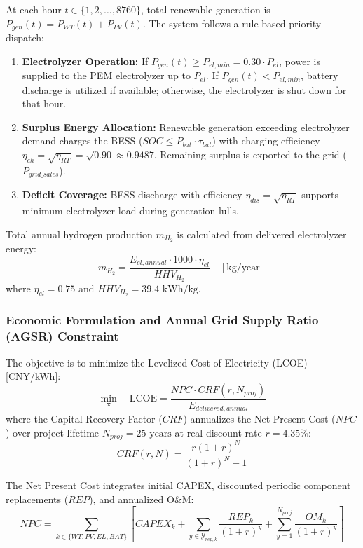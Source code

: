 At each hour $t \in \{1, 2, \dots, 8760\}$, total renewable generation is $P_{gen}(t) = P_{WT}(t) + P_{PV}(t)$. The system follows a rule-based priority dispatch:
\begin{enumerate}
    \item \textbf{Electrolyzer Operation:} If $P_{gen}(t) \ge P_{el,min} = 0.30 \cdot P_{el}$, power is supplied to the PEM electrolyzer up to $P_{el}$. If $P_{gen}(t) < P_{el,min}$, battery discharge is utilized if available; otherwise, the electrolyzer is shut down for that hour.
    \item \textbf{Surplus Energy Allocation:} Renewable generation exceeding electrolyzer demand charges the BESS ($SOC \le P_{bat} \cdot \tau_{bat}$) with charging efficiency $\eta_{ch} = \sqrt{\eta_{RT}} = \sqrt{0.90} \approx 0.9487$. Remaining surplus is exported to the grid ($P_{grid\_sales}$).
    \item \textbf{Deficit Coverage:} BESS discharge with efficiency $\eta_{dis} = \sqrt{\eta_{RT}}$ supports minimum electrolyzer load during generation lulls.
\end{enumerate}

Total annual hydrogen production $m_{H_2}$ is calculated from delivered electrolyzer energy:
\begin{equation}
m_{H_2} = \frac{E_{el,annual} \cdot 1000 \cdot \eta_{el}}{HHV_{H_2}} \quad [\text{kg/year}]
\label{eq:h2_production}
\end{equation}
where $\eta_{el} = 0.75$ and $HHV_{H_2} = 39.4\text{ kWh/kg}$.

\subsubsection{Economic Formulation and Annual Grid Supply Ratio (AGSR) Constraint}

The objective is to minimize the Levelized Cost of Electricity (LCOE) [CNY/kWh]:
\begin{equation}
\min_{\mathbf{x}} \quad \text{LCOE} = \frac{NPC \cdot CRF(r, N_{proj})}{E_{delivered,annual}}
\label{eq:lcoe_obj}
\end{equation}
where the Capital Recovery Factor ($CRF$) annualizes the Net Present Cost ($NPC$) over project lifetime $N_{proj} = 25\text{ years}$ at real discount rate $r = 4.35\%$:
\begin{equation}
CRF(r, N) = \frac{r(1+r)^N}{(1+r)^N - 1}
\label{eq:crf_factor}
\end{equation}

The Net Present Cost integrates initial CAPEX, discounted periodic component replacements ($REP$), and annualized O\&M:
\begin{equation}
NPC = \sum_{k \in \{WT, PV, EL, BAT\}} \left[ CAPEX_k + \sum_{y \in \mathcal{Y}_{rep,k}} \frac{REP_k}{(1+r)^y} + \sum_{y=1}^{N_{proj}} \frac{OM_k}{(1+r)^y} \right]
\label{eq:npc_formulation}
\end{equation}

